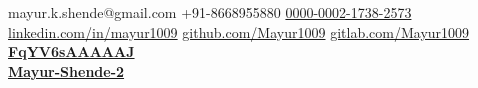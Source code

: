 \documentclass{my_cv}
\begin{document}
	
%				
%
	

        {}%
        {}%
        {mayur.k.shende@gmail.com}%
        {+91-8668955880}%
        {\href{https://orcid.org/0000-0002-1738-2573}{0000-0002-1738-2573}}%
        {\url{linkedin.com/in/mayur1009}}%
        {\url{github.com/Mayur1009}}%
    	{\url{gitlab.com/Mayur1009} \\ %
    		\ralewayextra {} \textbf{\href{https://scholar.google.com/citations?user=FqYV6sAAAAAJ&hl=en}{FqYV6sAAAAAJ}} \\
    		\ralewayextra {} \textbf{\href{https://www.researchgate.net/profile/Mayur-Shende-2}{Mayur-Shende-2}}
    	}%
\end{document}
